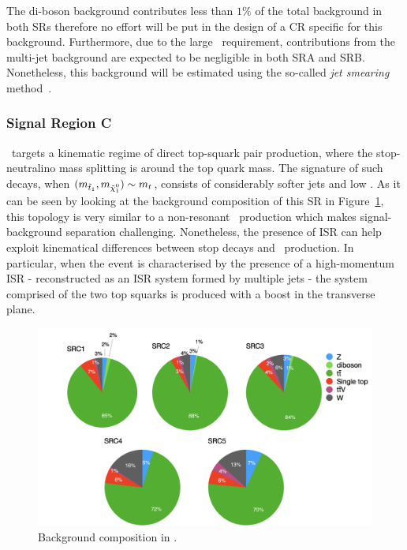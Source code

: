 				The di-boson background contributes less than $1\%$ of the total background in both \acp{SR} therefore no effort will be put in the design of a \ac{CR} specific for this background. Furthermore, due to the large \met\ requirement, contributions from the multi-jet background are expected to be negligible in both SRA and SRB. Nonetheless, this background will be estimated using the so-called \emph{jet smearing} method~\cite{calumThesis}.




			\subsubsection*{Signal Region C}

				\SRC\ targets a kinematic regime of direct top-squark pair production, where the stop-neutralino mass splitting is around the top quark mass. The signature of such decays, when $(\mstopone, \mninoone) \sim m_t$, consists of considerably softer jets and low \met. As it can be seen by looking at the background composition of this \ac{SR} in Figure~\ref{fig:SRC_bkgcomp}, this topology is very similar to a non-resonant \ttbar\ production which makes signal-background separation challenging. Nonetheless, the presence of \ac{ISR} can help exploit kinematical differences between stop decays and \ttbar\ production. In particular, when the event is characterised by the presence of a high-momentum \ac{ISR} - reconstructed as an \ac{ISR} system formed by multiple jets - the system comprised of the two top squarks is produced with a boost in the transverse plane.

				\begin{figure}[t]
				  \begin{center}
				   \includegraphics[width=\textwidth]{figures/stop/piechart_SRCcomp}
				   \caption{Background composition in \SRC.}
				   \label{fig:SRC_bkgcomp}
				  \end{center}
				\end{figure}


